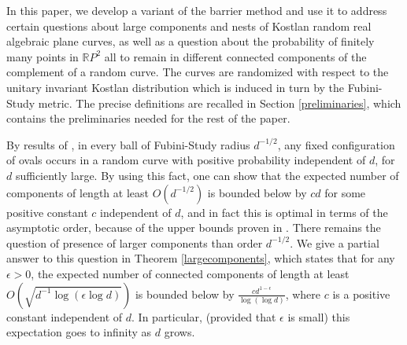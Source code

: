 \documentclass [11pt]{amsart}
\theoremstyle{remark}
\numberwithin{equation}{section}
\numberwithin{theorem}{section}
\begin{document}
In this paper, we develop a variant of the barrier method and use it to address certain questions about large components and nests of Kostlan random real algebraic plane curves, as well as a question about the probability of finitely many points in $\mathbb{R}P^2$ all to remain in different connected components of the complement of a random curve. The curves are randomized with respect to the unitary invariant Kostlan distribution which is induced in turn by the Fubini-Study metric. The precise definitions are recalled in Section \ref{preliminaries}, which contains the preliminaries needed for the rest of the paper.

By results of \cite{GW2}, in every ball of Fubini-Study radius $\displaystyle{d^{-1/2}}$, any fixed configuration of ovals occurs in a random curve  with positive probability independent of $d$, for $d$ sufficiently large. By using this fact, one can show that the expected number of components of length at least $\displaystyle{O\left(d^{-1/2}\right)}$ is bounded below by $cd$ for some positive constant $c$ independent of $d$, and in fact this is optimal in terms of the asymptotic order, because of the upper bounds proven in \cite{GW1}. There remains the question of presence of larger components than order $\displaystyle{d^{-1/2}}$. We give a partial answer to this question in Theorem \ref{largecomponents}, which states that for any $\epsilon>0$, the expected number of connected components of length at least $\displaystyle{O\left(\sqrt{d^{-1}\log(\epsilon \log d)}\right)}$ is bounded below by $\displaystyle{ \frac{cd^{1-\epsilon}}{\log(\log d)}}$, where $c$ is a positive constant independent of $d$. In particular, (provided that $\epsilon$ is small) this expectation goes to infinity as $d$ grows. 
\end{document}
